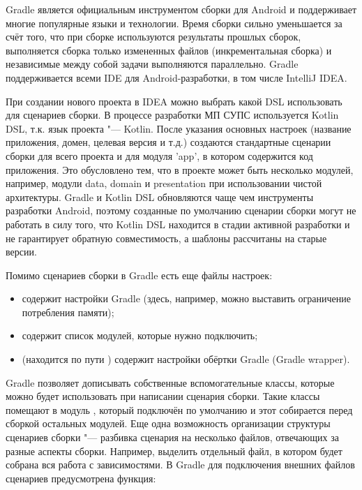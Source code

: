 Gradle является официальным инструментом сборки для Android и поддерживает многие популярные языки и технологии.
Время сборки сильно уменьшается за счёт того, что при сборке используются результаты прошлых сборок, выполняется сборка только измененных файлов (инкрементальная сборка) и независимые между собой задачи выполняются параллельно.
Gradle поддерживается всеми IDE для Android-разработки, в том числе IntelliJ IDEA\@.

При создании нового проекта в IDEA можно выбрать какой DSL использовать для сценариев сборки.
В процессе разработки МП СУПС используется Kotlin DSL, т.к. язык проекта "--- Kotlin.
После указания основных настроек (название приложения, домен, целевая версия и т.д.) создаются стандартные сценарии сборки для всего проекта и для модуля 'app', в котором содержится код приложения.
Это обусловлено тем, что в проекте может быть несколько модулей, например, модули data, domain и presentation при использовании чистой архитектуры.
Gradle и Kotlin DSL обновляются чаще чем инструменты разработки Android, поэтому созданные по умолчанию сценарии сборки могут не работать в силу того, что Kotlin DSL находится в стадии активной разработки и не гарантирует обратную совместимость, а шаблоны рассчитаны на старые версии.

Помимо сценариев сборки в Gradle есть еще файлы настроек:
\begin{itemize}
  \item {} содержит настройки Gradle (здесь, например, можно выставить ограничение потребления памяти);
  \item {} содержит список модулей, которые нужно подключить;
  \item {} (находится по пути ) содержит настройки обёртки Gradle (Gradle wrapper).
\end{itemize}

Gradle позволяет дописывать собственные вспомогательные классы, которые можно будет использовать при написании сценария сборки.
Такие классы помещают в модуль , который подключён по умолчанию и этот собирается перед сборкой остальных модулей.
Еще одна возможность организации структуры сценариев сборки "--- разбивка сценария на несколько файлов, отвечающих за разные аспекты сборки.
Например, выделить отдельный файл, в котором будет собрана вся работа с зависимостями.
В Gradle для подключения внешних файлов сценариев предусмотрена функция:

